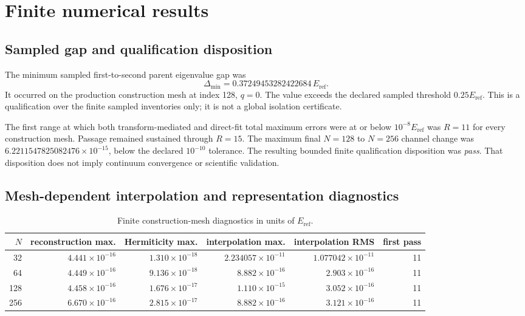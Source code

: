 \documentclass[11pt]{article}
\begin{document}
\section{Finite numerical results}

\subsection{Sampled gap and qualification disposition}

The minimum sampled first-to-second parent eigenvalue gap was
\begin{equation}
 \Delta_{\min}=0.37249453282422684\,E_{\mathrm{ref}}.
\end{equation}
It occurred on the production construction mesh at index 128, $q=0$.  The value exceeds
the declared sampled threshold $0.25E_{\mathrm{ref}}$.  This is a qualification over the
finite sampled inventories only; it is not a global isolation certificate.

The first range at which both transform-mediated and direct-fit total maximum errors
were at or below $10^{-8}E_{\mathrm{ref}}$ was $R=11$ for every construction mesh.
Passage remained sustained through $R=15$.  The maximum final $N=128$ to $N=256$
channel change was $6.2211547825082476\times10^{-15}$, below the declared
$10^{-10}$ tolerance.  The resulting bounded finite qualification disposition was
\emph{pass}.  That disposition does not imply continuum convergence or scientific
validation.

\subsection{Mesh-dependent interpolation and representation diagnostics}

\begin{table}[htbp]
\centering
\caption{Finite construction-mesh diagnostics in units of $E_{\mathrm{ref}}$.}
\begin{tabular}{rrrrrr}
\toprule
$N$ & reconstruction max. & Hermiticity max. & interpolation max. & interpolation RMS & first pass \\
\midrule
32  & $4.441\times10^{-16}$ & $1.310\times10^{-18}$ & $2.234057\times10^{-11}$ & $1.077042\times10^{-11}$ & 11 \\
64  & $4.449\times10^{-16}$ & $9.136\times10^{-18}$ & $8.882\times10^{-16}$ & $2.903\times10^{-16}$ & 11 \\
128 & $4.458\times10^{-16}$ & $1.676\times10^{-17}$ & $1.110\times10^{-15}$ & $3.052\times10^{-16}$ & 11 \\
256 & $6.670\times10^{-16}$ & $2.815\times10^{-17}$ & $8.882\times10^{-16}$ & $3.121\times10^{-16}$ & 11 \\
\bottomrule
\end{tabular}
\end{table}
\end{document}
